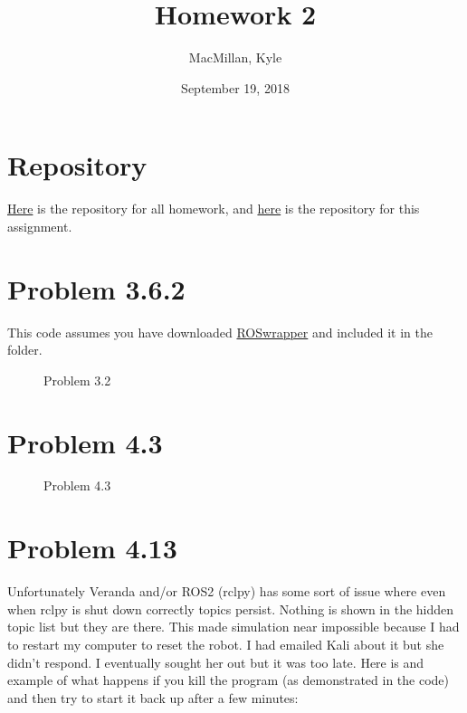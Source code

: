 \documentclass{article}
\title{\textbf{Homework 2}}
\author{MacMillan, Kyle}
\date{September 19, 2018}
\begin{document}
\maketitle

\newpage
\tableofcontents
{}




\newpage
\hypersetup{
    colorlinks,
    citecolor=blue,
    filecolor=black,
    linkcolor=blue,
    urlcolor=blue
}

\setcounter{page}{1}
\section{\textbf{Repository}}
\href{https://github.com/macattackftw/RoboticsHW}{Here} is the repository for all homework, and \href{https://github.com/macattackftw/RoboticsHW/tree/master/HW2}{here} is the repository for this assignment.

\newpage
\section{\textbf{Problem 3.6.2}}
This code assumes you have downloaded \href{https://github.com/macattackftw/ROSwrapper}{ROSwrapper} and included it in the folder.


\newpage
\begin{figure}[htbp]
  \centering
  
  \caption{Problem 3.2}
\end{figure}


\newpage
\section{\textbf{Problem 4.3}}


\newpage
\begin{figure}[htbp]
  \centering
  
  \caption{Problem 4.3}
\end{figure}


\newpage
\section{\textbf{Problem 4.13}}

Unfortunately Veranda and/or ROS2 (rclpy) has some sort of issue where even when rclpy is shut down correctly topics persist. Nothing is shown in the hidden topic list but they are there. This made simulation near impossible because I had to restart my computer to reset the robot. I had emailed Kali about it but she didn't respond. I eventually sought her out but it was too late. Here is and example of what happens if you kill the program (as demonstrated in the code) and then try to start it back up after a few minutes:
\end{document}
